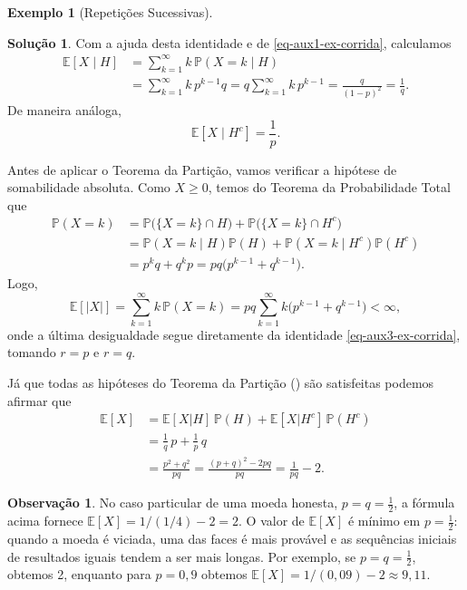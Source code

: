 \documentclass[12pt,portuguese]{article}
\theoremstyle{definition}
\newtheorem{example}[example]{Exemplo}
\newtheorem{remark}[remark]{Observação}
\newtheorem*{solution}{Solução}
\begin{document}
\begin{example}[Repetições Sucessivas]
\begin{solution}
Com a ajuda desta identidade e de \eqref{eq-aux1-ex-corrida}, calculamos
\begin{align*}
\mathbb{E}[X\mid H]
&= \sum_{k=1}^{\infty} k\,\mathbb{P}(X=k\mid H) \\
&= \sum_{k=1}^{\infty} k\,p^{k-1}q
 = q\sum_{k=1}^{\infty} k\,p^{k-1}
 = \frac{q}{(1-p)^2}
 = \frac{1}{q}.
\end{align*}
De maneira análoga,
\[
\mathbb{E}[X\mid H^c] = \frac{1}{p}.
\]

Antes de aplicar o Teorema da Partição, vamos verificar a hipótese
de somabilidade absoluta. Como \(X\geqslant 0\), temos do Teorema da Probabilidade Total que
\[
\begin{aligned}
\mathbb{P}(X=k)
&= \mathbb{P}\bigl(\{X=k\}\cap H\bigr)
 + \mathbb{P}\bigl(\{X=k\}\cap H^c\bigr) \\
&= \mathbb{P}(X=k\mid H)\mathbb{P}(H)
 + \mathbb{P}(X=k\mid H^c)\mathbb{P}(H^c) \\
&= p^kq+q^kp
 = pq\bigl(p^{k-1}+q^{k-1}\bigr).
\end{aligned}
\]
Logo,
\[
\mathbb{E}[|X|]
 = \sum_{k=1}^{\infty} k\,\mathbb{P}(X=k)
 = pq\sum_{k=1}^{\infty} k\bigl(p^{k-1}+q^{k-1}\bigr)
 <\infty,
\]
onde a última desigualdade segue diretamente da identidade \eqref{eq-aux3-ex-corrida},
tomando $r=p$ e $r=q$. 

\medskip

Já que todas as hipóteses do Teorema da Partição () 
são satisfeitas podemos afirmar que
\[
\begin{aligned}
\mathbb{E}[X]
&= \mathbb{E}[X|H] \, \mathbb{P}(H) + \mathbb{E}[X|H^c] \, \mathbb{P}(H^c) 
\\[0.3cm]
&= \frac{1}{q} \, p + \frac{1}{p} \, q 
\\[0.3cm]
&= \frac{p^2 + q^2}{pq}
= \frac{(p + q)^2 - 2pq}{pq}
= \frac{1}{pq} - 2.
\end{aligned}
\]
\end{solution}
\end{example}

\begin{remark}\label{rem:corrida-inicial-moeda-honesta}
No caso particular de uma moeda honesta, \(p = q = \tfrac12\), a fórmula acima
fornece \(\mathbb{E}[X] = 1/(1/4) - 2 = 2\). O valor de \(\mathbb{E}[X]\)
é mínimo em \(p = \tfrac12\): quando a moeda é viciada, uma das faces é mais
provável e as sequências iniciais de resultados iguais tendem a ser mais
longas. Por exemplo, se \(p = q = \tfrac12\), obtemos 2, enquanto para
\(p = 0{,}9\) obtemos
\(\mathbb{E}[X] = 1/(0{,}09) - 2 \approx 9{,}11\).
\end{remark}
\end{document}
